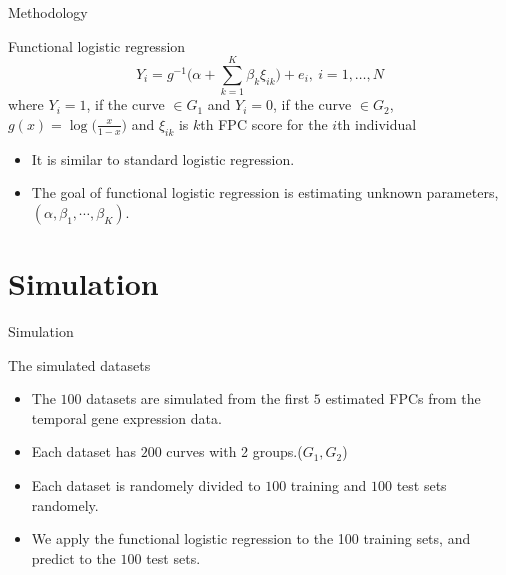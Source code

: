 \documentclass{beamer}
\begin{document}
\begin{frame}{Methodology}
	\begin{block}{Functional logistic regression}
		\vspace{0.1cm}
		$$ Y_i = g^{-1} \big( \alpha + \sum_{k=1}^K \beta_k\xi_{ik} \big) + e_i, \ i=1,\dots,N $$
		where $Y_i=1$, if the curve $\in G_1$ and $Y_i=0$, if the curve $\in G_2$,\\
		\hspace{0.9cm} $ g(x) = \log \big( \frac{x}{1-x} \big) $ and 
		$\xi_{ik}$ is $k$th FPC score for the $i$th individual
		\begin{itemize}
			\item {
				It is similar to standard logistic regression.
			}
			\item {
				The goal of functional logistic regression is estimating unknown parameters, $( \alpha, \beta_1, \cdots, \beta_K )$.
			}
		\end{itemize}
	\end{block}
\end{frame}


\section{Simulation}
\begin{frame}{Simulation}
	\begin{block}{The simulated datasets}
		\vspace{0.1cm}
		\begin{itemize}
			\item {
				The $100$ datasets are simulated from the first $5$ estimated FPCs from the temporal gene expression data.
			}
			\item {
				 Each dataset has $200$ curves with 2 groups.($G_1, G_2$)
			}
			\item {
				Each dataset is randomely divided to $100$ training and $100$ test sets randomely.
			}
			\item {
				We apply the functional logistic regression to the 100 training sets, and predict to the $100$ test sets.
			}
		\end{itemize}
	\end{block}
\end{frame}
\end{document}
